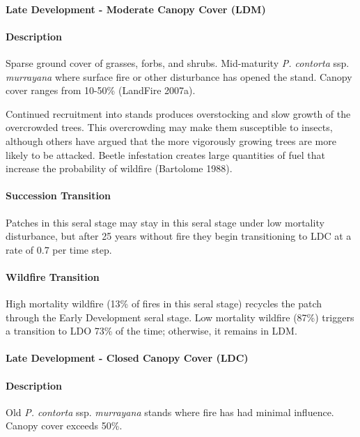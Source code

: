 \noindent\hrulefill

\paragraph{Late Development - Moderate Canopy Cover (LDM)}

\paragraph{Description} Sparse ground cover of grasses, forbs, and shrubs. Mid-maturity \emph{P. contorta} ssp. \emph{murrayana} where surface fire or other disturbance has opened the stand. Canopy cover ranges from 10-50\% (LandFire 2007a).

Continued recruitment into stands produces overstocking and slow growth of the overcrowded trees. This overcrowding may make them susceptible to insects, although others have argued that the more vigorously growing trees are more likely to be attacked. Beetle infestation creates large quantities of fuel that increase the probability of wildfire (Bartolome 1988).


\paragraph{Succession Transition} Patches in this seral stage may stay in this seral stage under low mortality disturbance, but after 25 years without fire they begin transitioning to LDC at a rate of 0.7 per time step. 

\paragraph{Wildfire Transition} High mortality wildfire (13\% of fires in this seral stage) recycles the patch through the Early Development seral stage. Low mortality wildfire (87\%) triggers a transition to LDO 73\% of the time; otherwise, it remains in LDM.

\noindent\hrulefill

\paragraph{Late Development - Closed Canopy Cover (LDC)}

\paragraph{Description} Old \emph{P. contorta} ssp. \emph{murrayana} stands where fire has had minimal influence. Canopy cover exceeds 50\%.

